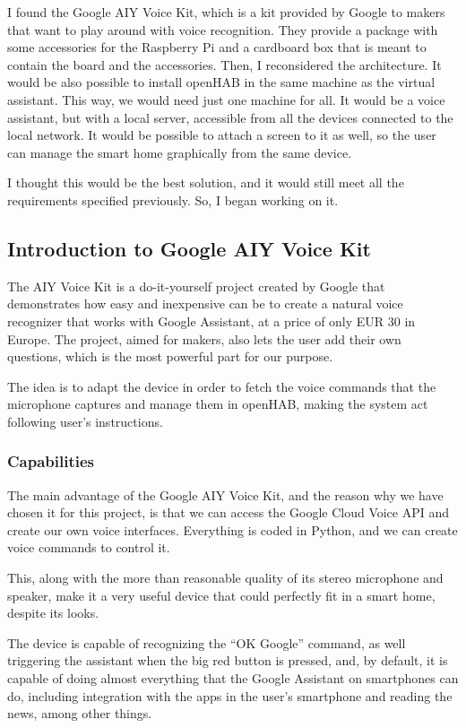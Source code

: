 I found the Google AIY Voice Kit, which is a kit provided by Google to makers that want to play around with voice recognition.
They provide a package with some accessories for the Raspberry Pi and a cardboard box that is meant to contain the board and the
accessories. Then, I reconsidered the architecture. It would be also possible to install openHAB in the same machine as the virtual
assistant. This way, we would need just one machine for all. It would be a voice assistant, but with a local server, accessible from
all the devices connected to the local network. It would be possible to attach a screen to it as well, so the user can manage the
smart home graphically from the same device.

I thought this would be the best solution, and it would still meet all the requirements specified previously. So, I began working on it.

\subsection{Introduction to Google AIY Voice Kit}
The AIY Voice Kit is a do-it-yourself project created by Google that demonstrates how easy and inexpensive can be to create a natural
voice recognizer that works with Google Assistant, at a price of only EUR 30 in Europe. The project, aimed for makers, also lets the
user add their own questions, which is the most powerful part for our purpose.

The idea is to adapt the device in order to fetch the voice commands that the microphone captures and manage them in openHAB,
making the system act following user’s instructions.

\subsubsection{Capabilities}
The main advantage of the Google AIY Voice Kit, and the reason why we have chosen it for this project, is that we can access the
Google Cloud Voice API and create our own voice interfaces. Everything is coded in Python, and we can create voice commands to
control it.

This, along with the more than reasonable quality of its stereo microphone and speaker, make it a very useful device that could
perfectly fit in a smart home, despite its looks.

The device is capable of recognizing the “OK Google” command, as well triggering the assistant when the big red button is pressed,
and, by default, it is capable of doing almost everything that the Google Assistant on smartphones can do, including integration
with the apps in the user’s smartphone and reading the news, among other things.

